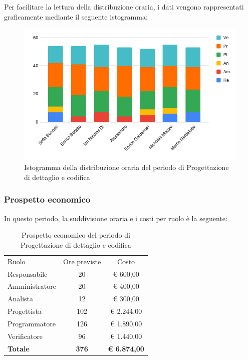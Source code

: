 \documentclass[../piano-di-progetto.tex]{subfiles}
\begin{document}
  Per facilitare la lettura della distribuzione oraria, i dati vengono rappresentati graficamente mediante il seguente istogramma:
  \begin{figure}[H]
    \centering
    \includegraphics[width=12cm]{img/ore-codifica.png}
    \caption{Istogramma della distribuzione oraria del periodo di Progettazione di dettaglio e codifica}
    \label{fig:ore-componente-codifica}
  \end{figure}

  \subsubsection{Prospetto economico}
  In questo periodo, la suddivisione oraria e i costi per ruolo è la seguente:

  \begin{table}[H]
    \centering
    \begin{tabular}{lcc}
      Ruolo           & Ore previste & Costo               \\
      Responsabile    & 20           & € 600,00            \\
      Amministratore  & 20           & € 400,00            \\
      Analista        & 12           & € 300,00            \\
      Progettista     & 102          & € 2.244,00          \\
      Programmatore   & 126          & € 1.890,00          \\
      Verificatore    & 96           & € 1.440,00          \\
      \textbf{Totale} & \textbf{376} & \textbf{€ 6.874,00}
    \end{tabular}
    \caption{Prospetto economico del periodo di Progettazione di dettaglio e codifica}
  \end{table}
\end{document}

